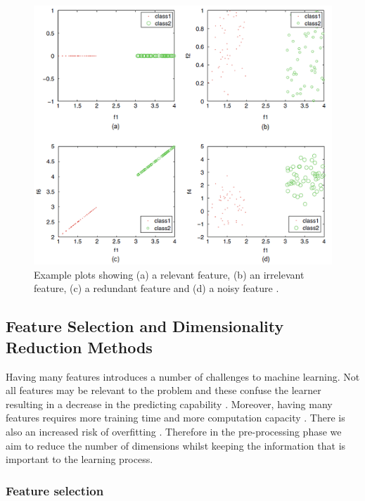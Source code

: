 \documentclass{article}[paper=a4,pagesize=auto,10pt]
\begin{document}
\begin{figure}[ht]
  	\includegraphics{graphics/feature_selection3.png}
  	\caption{Example plots showing (a) a relevant feature, (b) an irrelevant feature, (c) a redundant feature and (d) a noisy feature \cite{sammut2017encyclopedia}.}
  	\label{fig:feature_selection}
\end{figure}

\subsection{Feature Selection and Dimensionality Reduction Methods} \label{Feature Selection and Dimensionality Reduction Methods}

Having many features introduces a number of challenges to machine learning.  Not all features may be relevant to the problem and these confuse the learner resulting in a decrease in the predicting capability \cite{sammut2017encyclopedia}.  Moreover, having many features requires more training time and more computation capacity \cite{guyon2003introduction}. There is also an increased risk of overfitting \cite{de2015feature}.  Therefore in the pre-processing phase we aim to reduce the number of dimensions whilst keeping the information that is important to the learning process.




\subsubsection{Feature selection} \label{Feature selection}
\end{document}
